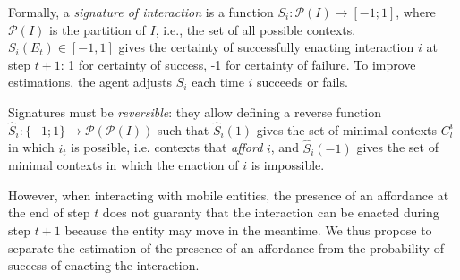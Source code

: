 \documentclass[conference]{IEEEtran}
\makeatletter
\let\cite\relax
\DeclareRobustCommand{\cite}{%
	\let\new@cite@pre\@gobble
	\@ifnextchar[\new@cite{\@citex[]}}
\def\new@cite[#1]{\@ifnextchar[{\new@citea{#1}}{\@citex[#1]}}
\def\new@citea#1{\def\new@cite@pre{#1}\@citex}
\makeatother
\begin{document}

Formally, a \textit{signature of interaction} is a function $S_i : \mathcal{P}(I) \rightarrow [-1;1]$, where $\mathcal{P}(I)$ is the partition of $I$, i.e., the set of all possible contexts.
$S_i(E_{t}) \in [-1, 1]$ gives the certainty of successfully enacting interaction $i$ at step $t+1$: 1 for certainty of success, -1 for certainty of failure.
To improve estimations, the agent adjusts $S_i$ each time $i$ succeeds or fails. %

Signatures must be \textit{reversible}: they allow defining a reverse function $\hat{S}_i : \{-1;1\} \rightarrow \mathcal{P}(\mathcal{P}(I))$ such that  $\hat{S}_i(1)$ gives the set of minimal contexts $C_l^i$ in which $i_t$ is possible, i.e. contexts that \textit{afford} $i$, and $\hat{S}_i(-1)$ gives the set of minimal contexts in which the enaction of $i$ is impossible.




However, when interacting with mobile entities, the presence of an affordance at the end of step $t$ does not guaranty that the interaction can be enacted during step $t+1$ because the entity may move in the meantime.
We thus propose to separate the estimation of the presence of an affordance from the probability of success of enacting the interaction.
\end{document}
